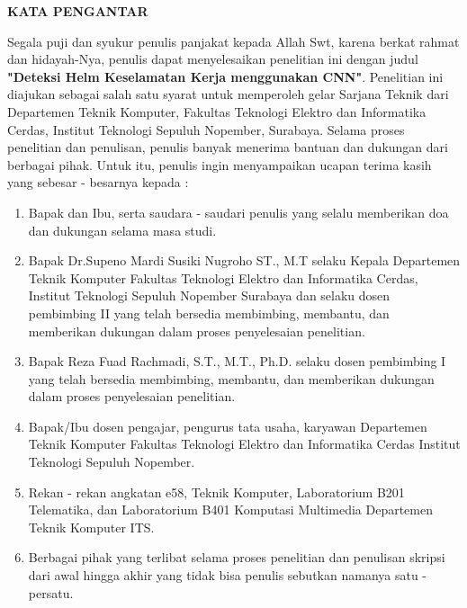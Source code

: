 \begin{center}
  \Large
  \textbf{KATA PENGANTAR}
\end{center}


\vspace{2ex}


\par Segala puji dan syukur penulis panjakat kepada Allah Swt,
karena berkat rahmat dan hidayah-Nya, penulis dapat menyelesaikan
penelitian ini dengan judul \textbf{"Deteksi Helm Keselamatan Kerja menggunakan CNN"}.
Penelitian ini diajukan sebagai salah satu syarat untuk memperoleh gelar Sarjana Teknik
dari Departemen Teknik Komputer, Fakultas Teknologi Elektro dan Informatika Cerdas, Institut
Teknologi Sepuluh Nopember, Surabaya. Selama proses penelitian dan penulisan, penulis
banyak menerima bantuan dan dukungan dari berbagai pihak. Untuk itu, penulis ingin menyampaikan
ucapan terima kasih yang sebesar - besarnya kepada :

\begin{enumerate}[nolistsep]

  \item Bapak dan Ibu, serta saudara - saudari penulis yang selalu memberikan doa dan dukungan selama masa studi.

  \item Bapak Dr.Supeno Mardi Susiki Nugroho ST., M.T selaku Kepala Departemen Teknik Komputer Fakultas Teknologi Elektro dan Informatika Cerdas, Institut Teknologi Sepuluh Nopember Surabaya dan selaku dosen pembimbing II yang telah bersedia membimbing, membantu, dan memberikan dukungan dalam proses penyelesaian penelitian.
  \item Bapak Reza Fuad Rachmadi, S.T., M.T., Ph.D. selaku dosen pembimbing I yang telah bersedia membimbing, membantu, dan memberikan dukungan dalam proses penyelesaian penelitian.
  \item Bapak/Ibu dosen pengajar, pengurus tata usaha, karyawan Departemen Teknik Komputer Fakultas Teknologi Elektro dan Informatika Cerdas Institut Teknologi Sepuluh Nopember.
  \item Rekan - rekan angkatan e58, Teknik Komputer, Laboratorium B201 Telematika, dan Laboratorium B401 Komputasi Multimedia Departemen Teknik Komputer ITS.
  \item Berbagai pihak yang terlibat selama proses penelitian dan penulisan skripsi dari awal hingga akhir yang tidak bisa penulis sebutkan namanya satu - persatu.

\end{enumerate}

